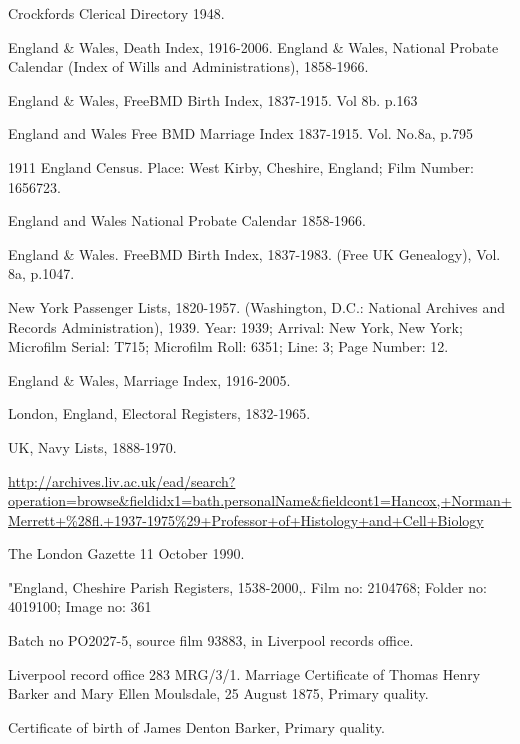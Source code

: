 \begin{thebibliography}{99}
	 Crockfords Clerical Directory 1948. 
	 
	 England \& Wales, Death Index, 1916-2006.
	 England \& Wales, National Probate Calendar (Index of Wills and Administrations), 1858-1966. 
	 
	England \& Wales, FreeBMD Birth Index, 1837-1915. Vol 8b. p.163
	
	England and Wales Free BMD Marriage Index 1837-1915. Vol. No.8a, p.795
	
	1911 England Census. Place: West Kirby, Cheshire, England; Film Number: 1656723.

	England and Wales National Probate Calendar 1858-1966.
	
	England \& Wales. FreeBMD Birth Index, 1837-1983. (Free UK Genealogy), Vol. 8a, p.1047. 
	
	New York Passenger Lists, 1820-1957. (Washington, D.C.: National Archives and Records Administration), 1939.
	Year: 1939; Arrival: New York, New York; Microfilm Serial: T715; Microfilm Roll: 6351; Line: 3; Page Number: 12.

	England \& Wales, Marriage Index, 1916-2005. 
	
	 London, England, Electoral Registers, 1832-1965. 
	 
	 UK, Navy Lists, 1888-1970.
	 
	\url{http://archives.liv.ac.uk/ead/search?operation=browse&fieldidx1=bath.personalName&fieldcont1=Hancox,+Norman+Merrett+\%28fl.+1937-1975\%29+Professor+of+Histology+and+Cell+Biology}

	The London Gazette 11 October 1990. 
	
	"England, Cheshire Parish Registers, 1538-2000,.
	Film no: 2104768; Folder no: 4019100; Image no: 361

	 Batch no PO2027-5, source film 93883, in Liverpool records office.
	 
	Liverpool record office 283 MRG/3/1.
	Marriage Certificate of Thomas Henry Barker and Mary Ellen Moulsdale, 25 August 1875, Primary quality. 
	
	Certificate of birth of James Denton Barker, Primary quality. 
	

\end{thebibliography}
